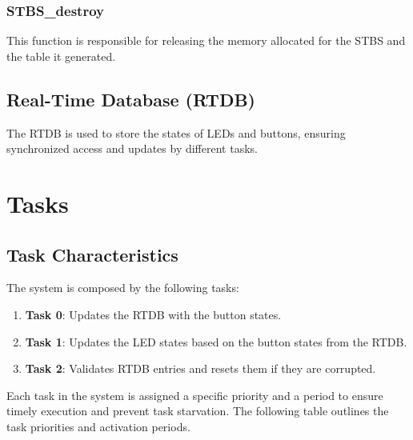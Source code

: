 \documentclass[a4paper,12pt]{article}
\begin{document}
\subsubsection{STBS\_destroy}
This function is responsible for releasing the memory allocated for the STBS and the table it generated.

\subsection{Real-Time Database (RTDB)}
The RTDB is used to store the states of LEDs and buttons, ensuring synchronized access and updates by different tasks.

\section{Tasks}
\subsection{Task Characteristics}
The system is composed by the following tasks:
\begin{enumerate}
    \item \textbf{Task 0}: Updates the RTDB with the button states.
    \item \textbf{Task 1}: Updates the LED states based on the button states from the RTDB.
    \item \textbf{Task 2}: Validates RTDB entries and resets them if they are corrupted.
\end{enumerate}

Each task in the system is assigned a specific priority and a period to ensure timely execution and prevent task starvation. The following table outlines the task priorities and activation periods.
\end{document}
